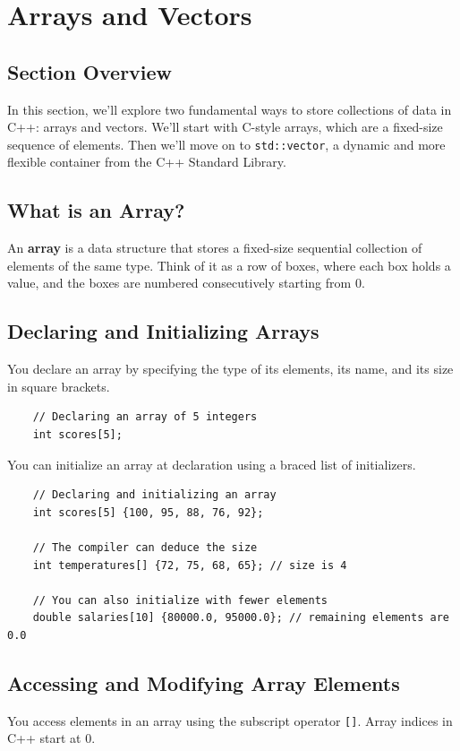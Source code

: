 \section{Arrays and Vectors}

\subsection{Section Overview}
In this section, we'll explore two fundamental ways to store collections of data in C++: arrays and vectors. We'll start with C-style arrays, which are a fixed-size sequence of elements. Then we'll move on to \texttt{std::vector}, a dynamic and more flexible container from the C++ Standard Library.

\subsection{What is an Array?}
An \textbf{array} is a data structure that stores a fixed-size sequential collection of elements of the same type. Think of it as a row of boxes, where each box holds a value, and the boxes are numbered consecutively starting from 0.

\subsection{Declaring and Initializing Arrays}
You declare an array by specifying the type of its elements, its name, and its size in square brackets.

\begin{lstlisting}
	// Declaring an array of 5 integers
	int scores[5];
\end{lstlisting}

You can initialize an array at declaration using a braced list of initializers.

\begin{lstlisting}
	// Declaring and initializing an array
	int scores[5] {100, 95, 88, 76, 92};

	// The compiler can deduce the size
	int temperatures[] {72, 75, 68, 65}; // size is 4

	// You can also initialize with fewer elements
	double salaries[10] {80000.0, 95000.0}; // remaining elements are 0.0
\end{lstlisting}

\subsection{Accessing and Modifying Array Elements}
You access elements in an array using the subscript operator \texttt{[]}. Array indices in C++ start at 0.

